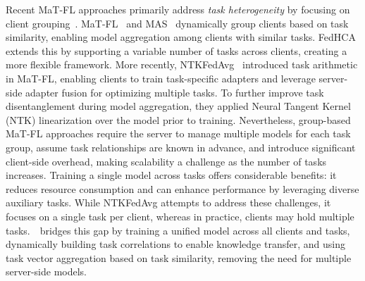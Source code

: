 Recent MaT-FL approaches primarily address \textit{task heterogeneity} by focusing on client grouping~\cite{10208649,zhuang2023mas,lu2023towards}. MaT-FL~\cite{10208649} and MAS~\cite{zhuang2023mas} dynamically group clients based on task similarity, enabling model aggregation among clients with similar tasks. FedHCA~\cite{lu2023towards} extends this by supporting a variable number of tasks across clients, creating a more flexible framework. More recently, NTKFedAvg~\cite{muhamed2024fed} introduced task arithmetic in MaT-FL, enabling clients to train task-specific adapters and leverage server-side adapter fusion for optimizing multiple tasks. To further improve task disentanglement during model aggregation, they applied Neural Tangent Kernel (NTK) linearization over the model prior to training. Nevertheless, group-based MaT-FL approaches require the server to manage multiple models for each task group, assume task relationships are known in advance, and introduce significant client-side overhead, making scalability a challenge as the number of tasks increases. Training a single model across tasks offers considerable benefits: it reduces resource consumption and can enhance performance by leveraging diverse auxiliary tasks. While NTKFedAvg attempts to address these challenges, it focuses on a single task per client, whereas in practice, clients may hold multiple tasks.~\method~bridges this gap by training a unified model across all clients and tasks, dynamically building task correlations to enable knowledge transfer, and using task vector aggregation based on task similarity, removing the need for multiple server-side models.